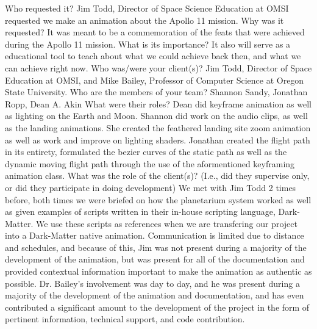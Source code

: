 \documentclass[onecolumn, draftclsnofoot,10pt, compsoc]{IEEEtran}
\begin{document}
Who requested it?
Jim Todd, Director of Space Science Education at OMSI requested we make an animation about the Apollo 11 mission.
Why was it requested?
It was meant to be a commemoration of the feats that were achieved during the Apollo 11 mission. 
What is its importance?
It also will serve as a educational tool to teach about what we could achieve back then, and what we can achieve right now.
Who was/were your client(s)?
Jim Todd, Director of Space Education at OMSI, and Mike Bailey, Professor of Computer Science at Oregon State University.
Who are the members of your team?
Shannon Sandy, Jonathan Ropp, Dean A. Akin
What were their roles?
Dean did keyframe animation as well as lighting on the Earth and Moon. Shannon did work on the audio clips, as well as the landing animations. She created the feathered landing site zoom animation as well as work and improve on lighting shaders. Jonathan created the flight path in its entirety, formulated the bezier curves of the static path as well as the dynamic moving flight path through the use of the aformentioned keyframing animation class. 
What was the role of the client(s)? (I.e., did they supervise only, or did they participate in doing development)
We met with Jim Todd 2 times before, both times we were briefed on how the planetarium system worked as well as given examples of scripts written in their in-house scripting language, Dark-Matter. We use these scripts as references when we are transfering our project into a Dark-Matter native animation. Communication is limited due to distance and schedules, and because of this, Jim was not present during a majority of the development of the animation, but was present for all of the documentation and provided contextual information important to make the animation as authentic as possible. Dr. Bailey's involvement was day to day, and he was present during a majority of the development of the animation and documentation, and has even contributed a significant amount to the development of the project in the form of pertinent information, technical support, and code contribution. 
\end{document}
